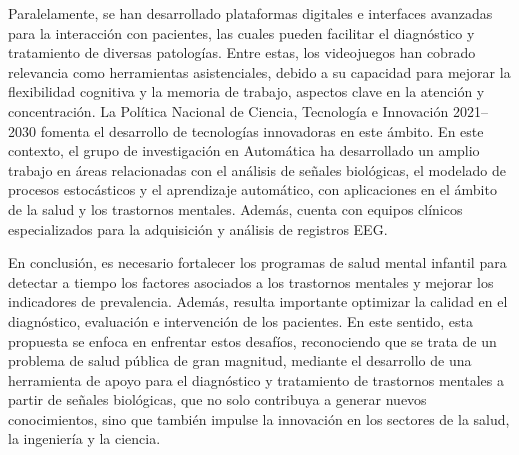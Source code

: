 Paralelamente, se han desarrollado plataformas digitales e interfaces avanzadas para la interacción con pacientes, las cuales pueden facilitar el diagnóstico y tratamiento de diversas patologías. Entre estas, los videojuegos han cobrado relevancia como herramientas asistenciales, debido a su capacidad para mejorar la flexibilidad cognitiva y la memoria de trabajo, aspectos clave en la atención y concentración. La Política Nacional de Ciencia, Tecnología e Innovación 2021–2030 fomenta el desarrollo de tecnologías innovadoras en este ámbito. En este contexto, el grupo de investigación en Automática ha desarrollado un amplio trabajo en áreas relacionadas con el análisis de señales biológicas, el modelado de procesos estocásticos y el aprendizaje automático, con aplicaciones en el ámbito de la salud y los trastornos mentales. Además, cuenta con equipos clínicos especializados para la adquisición y análisis de registros EEG.


En conclusión, es necesario fortalecer los programas de salud mental infantil para detectar a tiempo los factores asociados a los trastornos mentales y mejorar los indicadores de prevalencia. Además, resulta importante optimizar la calidad en el diagnóstico, evaluación e intervención de los pacientes. En este sentido, esta propuesta se enfoca en enfrentar estos desafíos, reconociendo que se trata de un problema de salud pública de gran magnitud, mediante el desarrollo de una herramienta de apoyo para el diagnóstico y tratamiento de trastornos mentales a partir de señales biológicas, que no solo contribuya a generar nuevos conocimientos, sino que también impulse la innovación en los sectores de la salud, la ingeniería y la ciencia.
